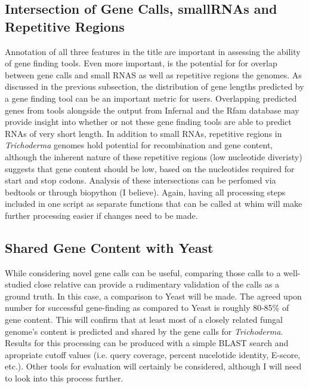 \documentclass[12pt]{article}
\begin{document}
\subsection{Intersection of Gene Calls, smallRNAs and Repetitive Regions}

Annotation of all three features in the title are important in
assessing the ability of gene finding tools. Even more important, is
the potential for for overlap between gene calls and small RNAS as
well as repetitive regions the genomes. As discussed in the previous
subsection, the distribution of gene lengths predicted by a gene
finding tool can be an important metric for users. Overlapping
predicted genes from tools alongside the output from Infernal and the
Rfam database may provide insight into whether or not these gene
finding tools are able to predict RNAs of very short length. In
addition to small RNAs, repetitive regions in \textit{Trichoderma}
genomes hold potential for recombination and gene content, although
the inherent nature of these repetitive regions (low nucleotide
diveristy) suggests that gene content should be low, based on the
nucleotides required for start and stop codons. Analysis of these
intersections can be perfomed via bedtools or through biopython (I
believe). Again, having all processing steps included in one script as
separate functions that can be called at whim will make further
processing easier if changes need to be made.

\subsection{Shared Gene Content with Yeast}

While considering novel gene calls can be useful, comparing those
calls to a well-studied close relative can provide a rudimentary
validation of the calls as a ground truth. In this case, a comparison
to Yeast will be made. The agreed upon number for successful
gene-finding as compared to Yeast is roughly 80-85\% of gene
content. This will confirm that at least most of a closely related
fungal genome's content is predicted and shared by the gene calls for
\textit{Trichoderma}. Results for this processing can be produced with
a simple BLAST search and apropriate cutoff values (i.e. query
coverage, percent nucelotide identity, E-score, etc.). Other tools for
evaluation will certainly be considered, although I will need to look
into this process further.
\end{document}
